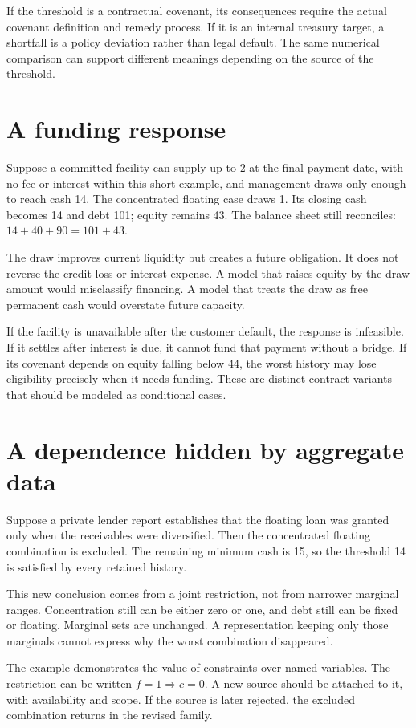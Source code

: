 If the threshold is a contractual covenant, its consequences require the actual covenant definition and remedy process. If it is an internal treasury target, a shortfall is a policy deviation rather than legal default. The same numerical comparison can support different meanings depending on the source of the threshold.

\section{A funding response}
Suppose a committed facility can supply up to 2 at the final payment date, with no fee or interest within this short example, and management draws only enough to reach cash 14. The concentrated floating case draws 1. Its closing cash becomes 14 and debt 101; equity remains 43. The balance sheet still reconciles: $14+40+90=101+43$.

The draw improves current liquidity but creates a future obligation. It does not reverse the credit loss or interest expense. A model that raises equity by the draw amount would misclassify financing. A model that treats the draw as free permanent cash would overstate future capacity.

If the facility is unavailable after the customer default, the response is infeasible. If it settles after interest is due, it cannot fund that payment without a bridge. If its covenant depends on equity falling below 44, the worst history may lose eligibility precisely when it needs funding. These are distinct contract variants that should be modeled as conditional cases.

\section{A dependence hidden by aggregate data}
Suppose a private lender report establishes that the floating loan was granted only when the receivables were diversified. Then the concentrated floating combination is excluded. The remaining minimum cash is 15, so the threshold 14 is satisfied by every retained history.

This new conclusion comes from a joint restriction, not from narrower marginal ranges. Concentration still can be either zero or one, and debt still can be fixed or floating. Marginal sets are unchanged. A representation keeping only those marginals cannot express why the worst combination disappeared.

The example demonstrates the value of constraints over named variables. The restriction can be written $f=1\Rightarrow c=0$. A new source should be attached to it, with availability and scope. If the source is later rejected, the excluded combination returns in the revised family.


